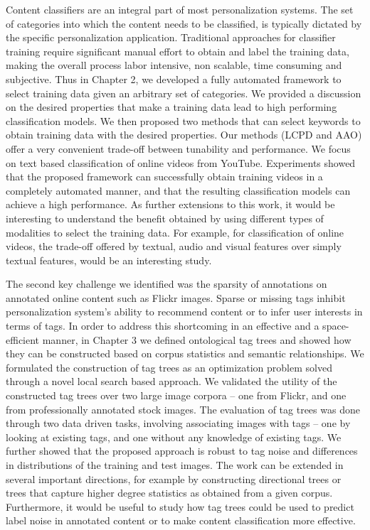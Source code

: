 \documentclass[12pt]{ucsddissertation}
\begin{document}
Content classifiers are an integral part of most personalization systems. The set of categories into which the content needs to be classified, is typically dictated by the specific personalization application. Traditional approaches for classifier training require significant manual effort to obtain and label the training data, making the overall process labor intensive, non scalable, time consuming and subjective. Thus in Chapter 2, we developed a fully automated framework to select training data given an arbitrary set of categories. We provided a discussion on the desired properties that make a training data lead to high performing classification models. We then proposed two methods that can select keywords to obtain training data with the desired properties. Our methods (LCPD and AAO) offer a very convenient trade-off between tunability and performance. We focus on text based classification of online videos from YouTube. Experiments showed that the proposed framework can successfully obtain training videos in a completely automated manner, and that the resulting classification models can achieve a high performance. As further extensions to this work, it would be interesting to understand the benefit obtained by using different types of modalities to select the training data. For example, for classification of online videos, the trade-off offered by textual, audio and visual features over simply textual features, would be an interesting study. 

The second key challenge we identified was the sparsity of annotations on annotated online content such as Flickr images. Sparse or missing tags inhibit personalization system's ability to recommend content or to infer user interests in terms of tags. In order to address this shortcoming in an effective and a space-efficient manner, in Chapter 3 we defined ontological tag trees and showed how they can be constructed based on corpus statistics and semantic relationships. We formulated the construction of tag trees as an optimization problem solved through a novel local search based approach. We validated the utility of the constructed tag trees over two large image corpora -- one from Flickr, and one from professionally annotated stock images. The evaluation of tag trees was done through two data driven tasks, involving associating images with tags -- one by looking at existing tags, and one without any knowledge of existing tags. We further showed that the proposed approach is robust to tag noise and differences in distributions of the training and test images. The work can be extended in several important directions, for example by constructing directional trees or trees that capture higher degree statistics as obtained from a given corpus. Furthermore, it would be useful to study how tag trees could be used to predict label noise in annotated content or to make content classification more effective. 
\end{document}
